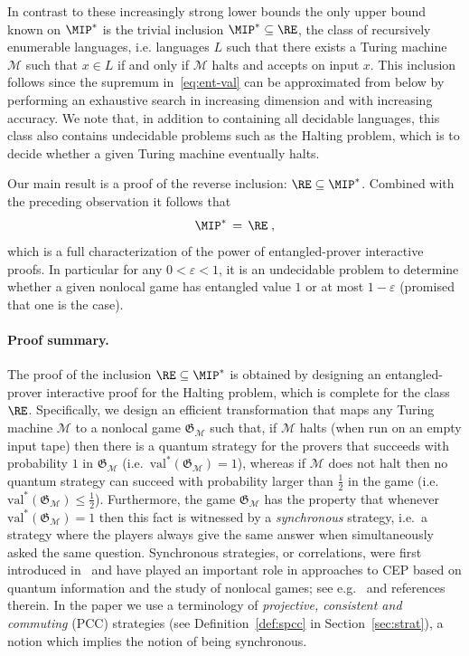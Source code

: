 \documentclass[11pt]{article}
\theoremstyle{definition}
\newcommand{\cM}{\ensuremath{\mathcal{M}}}
\newcommand{\val}{\ensuremath{\mathrm{val}}}
\newcommand{\eps}{\varepsilon}
\newcommand{\game}{\mathfrak{G}}
\renewcommand{\cal}[1]{\mathcal{#1}}
\begin{document}
In contrast to these increasingly strong lower bounds the only upper bound known on $\MIP^*$ is the trivial inclusion $\MIP^* \subseteq \RE$, the class of recursively enumerable languages, i.e. languages $L$ such that there exists a Turing machine $\cM$ such that $x\in L$ if and only if $\cM$ halts and accepts on input $x$. This inclusion follows since the supremum in~\eqref{eq:ent-val} can be approximated from below by performing an exhaustive search in increasing dimension and with increasing accuracy. We note that, in addition to containing all decidable languages, this class also contains undecidable problems such as the Halting problem, which is to decide whether a given Turing machine eventually halts.

Our main result is a proof of the reverse inclusion: $\RE \subseteq \MIP^*$. Combined with the preceding observation it follows that 
\[ \MIP^* \,=\, \RE \;,\]
which is a full characterization of the power of entangled-prover interactive proofs. In particular for any $0 < \eps < 1$, it is an undecidable problem to determine whether a given nonlocal game has entangled value $1$ or at most $1 - \eps$ (promised that one is the case).

\paragraph{Proof summary.}
The proof of the inclusion $\RE \subseteq \MIP^*$ is obtained by designing an entangled-prover interactive proof for the Halting problem, which is complete for the class $\RE$. Specifically, we design an efficient transformation that maps any Turing machine $\cal{M}$ to a 
nonlocal game $\game_{\cal{M}}$ such that, if $\cal{M}$ halts (when run on an empty input tape) then there is a quantum strategy for the provers that succeeds with probability $1$ in $\game_{\cal{M}}$ (i.e.\ $\val^*(\game_{\cal{M}})=1$), whereas if $\cal{M}$ does not halt then no quantum strategy can succeed with probability larger than $\frac{1}{2}$ in the game (i.e.\ $\val^*(\game_{\cal{M}})\leq \frac{1}{2}$). Furthermore, the game $\game_\cal{M}$ has the property that whenever $\val^*(\game_\cal{M})=1$ then this fact is witnessed by a \emph{synchronous} strategy, i.e.\ a strategy where the players always give the same answer when simultaneously asked the same question. Synchronous strategies, or correlations, were first introduced in~\cite{paulsen2016estimating} and have played an important role in approaches to CEP based on quantum information and the study of nonlocal games; see e.g.~\cite{kim2018synchronous} and references therein. 
In the paper we use a terminology of \emph{projective, consistent and commuting} (PCC) strategies (see Definition~\ref{def:spcc} in Section~\ref{sec:strat}), a notion which implies the notion of being synchronous. 
\end{document}
